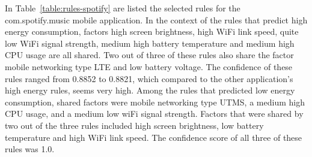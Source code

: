 In Table~\ref{table:rules-spotify} are listed the selected rules for the com.spotify.music mobile application. In the context of the rules that predict high energy consumption, factors high screen brightness, high WiFi link speed, quite low WiFi signal strength, medium high battery temperature and medium high CPU usage are all shared. Two out of three of these rules also share the factor mobile networking type LTE and low battery voltage. The confidence of these rules ranged from 0.8852 to 0.8821, which compared to the other application's high energy rules, seems very high. Among the rules that predicted low energy consumption, shared factors were mobile networking type UTMS, a medium high CPU usage, and a medium low wiFi signal strength. Factors that were shared by two out of the three rules included high screen brightness, low battery temperature and high WiFi link speed. The confidence score of all three of these rules was 1.0. 

